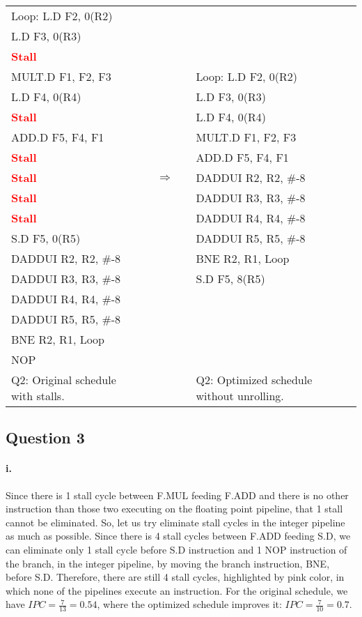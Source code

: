 \documentclass[11pt]{article}
\newcommand{\q}[1]{\subsection*{Question {#1}}}
\renewcommand{\part}[1]{\paragraph*{{#1}.}}
\newcommand{\code}[1]{\textsf{#1}}
\newcommand{\stall}{\textcolor{red}{\textbf{Stall}}}
\begin{document}
\begin{table}[h]
\center
\small
\begin{tabular}{lcccl}
	  \code{Loop:} \code{L.D F2, 0(R2)} & & & & \\
	 \code{L.D F3, 0(R3)} & & & & \\
	 \stall & & & &\\
	 \code{MULT.D F1, F2, F3} & & & &  \code{Loop:} \code{L.D F2, 0(R2)} \\
	 \code{L.D F4, 0(R4)} & & & & \code{L.D F3, 0(R3)} \\
	 \stall & & & & \code{L.D F4, 0(R4)} \\
	 \code{ADD.D F5, F4, F1} & & & & \code{MULT.D F1, F2, F3} \\
	 \stall & & & & \code{ADD.D F5, F4, F1} \\
	 \stall & & $\Rightarrow$ & & \code{DADDUI R2, R2, \#-8} \\
	 \stall & & & & \code{DADDUI R3, R3, \#-8} \\
	 \stall & & & & \code{DADDUI R4, R4, \#-8} \\
	 \code{S.D F5, 0(R5)} & & & & \code{DADDUI R5, R5, \#-8} \\
	 \code{DADDUI R2, R2, \#-8} & & & & \code{BNE R2, R1, Loop} \\
	 \code{DADDUI R3, R3, \#-8} & & & & \code{S.D F5, 8(R5)} \\
	 \code{DADDUI R4, R4, \#-8} & & & &\\
	 \code{DADDUI R5, R5, \#-8} & & & & \\
	 \code{BNE R2, R1, Loop} & & & &\\
	 \code{NOP} & & & &\\
	 Q2: Original schedule with stalls. & & & & Q2: Optimized schedule without unrolling.
\end{tabular}
\label{tbl:q2}
\end{table}


\q{3} 
\part{i} Since there is 1 stall cycle between \code{F.MUL} feeding \code{F.ADD} and there is no other instruction than those two executing on the floating point pipeline, that 1 stall cannot be eliminated. So, let us try eliminate stall cycles in the integer pipeline as much as possible. Since there is 4 stall cycles between \code{F.ADD} feeding \code{S.D}, we can eliminate only 1 stall cycle before \code{S.D} instruction and 1 \code{NOP} instruction of the branch, in the integer pipeline, by moving the branch instruction, \code{BNE}, before \code{S.D}. Therefore, there are still 4 stall cycles, highlighted by pink color, in which none of the pipelines execute an instruction. For the original schedule, we have $IPC=\frac{7}{13}=0.54$, where the optimized schedule improves it: $IPC=\frac{7}{10}=0.7$.
\end{document}
